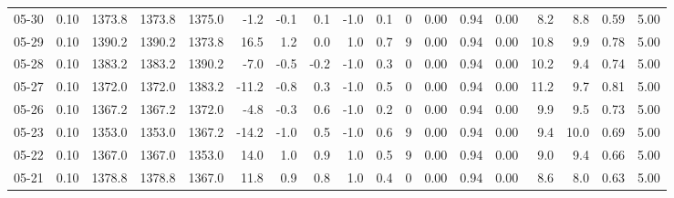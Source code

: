 \begin{threeparttable}
{\begin{tabular}{lrrrrrrrrrrrrrrrrr}
  05-30 &     0.10 & 1373.8 & 1373.8 & 1375.0 &       -1.2 &           -0.1 &                       0.1 &                     -1.0 &                 0.1 &              0 &       0.00 &      0.94 &           0.00 &              8.2 &                 8.8 &            0.59 &                   5.00 \\
  05-29 &     0.10 & 1390.2 & 1390.2 & 1373.8 &       16.5 &            1.2 &                       0.0 &                      1.0 &                 0.7 &              9 &       0.00 &      0.94 &           0.00 &             10.8 &                 9.9 &            0.78 &                   5.00 \\
  05-28 &     0.10 & 1383.2 & 1383.2 & 1390.2 &       -7.0 &           -0.5 &                      -0.2 &                     -1.0 &                 0.3 &              0 &       0.00 &      0.94 &           0.00 &             10.2 &                 9.4 &            0.74 &                   5.00 \\
  05-27 &     0.10 & 1372.0 & 1372.0 & 1383.2 &      -11.2 &           -0.8 &                       0.3 &                     -1.0 &                 0.5 &              0 &       0.00 &      0.94 &           0.00 &             11.2 &                 9.7 &            0.81 &                   5.00 \\
  05-26 &     0.10 & 1367.2 & 1367.2 & 1372.0 &       -4.8 &           -0.3 &                       0.6 &                     -1.0 &                 0.2 &              0 &       0.00 &      0.94 &           0.00 &              9.9 &                 9.5 &            0.73 &                   5.00 \\
  05-23 &     0.10 & 1353.0 & 1353.0 & 1367.2 &      -14.2 &           -1.0 &                       0.5 &                     -1.0 &                 0.6 &              9 &       0.00 &      0.94 &           0.00 &              9.4 &                10.0 &            0.69 &                   5.00 \\
  05-22 &     0.10 & 1367.0 & 1367.0 & 1353.0 &       14.0 &            1.0 &                       0.9 &                      1.0 &                 0.5 &              9 &       0.00 &      0.94 &           0.00 &              9.0 &                 9.4 &            0.66 &                   5.00 \\
  05-21 &     0.10 & 1378.8 & 1378.8 & 1367.0 &       11.8 &            0.9 &                       0.8 &                      1.0 &                 0.4 &              0 &       0.00 &      0.94 &           0.00 &              8.6 &                 8.0 &            0.63 &                   5.00 \\

\end{tabular}}
\end{threeparttable}
